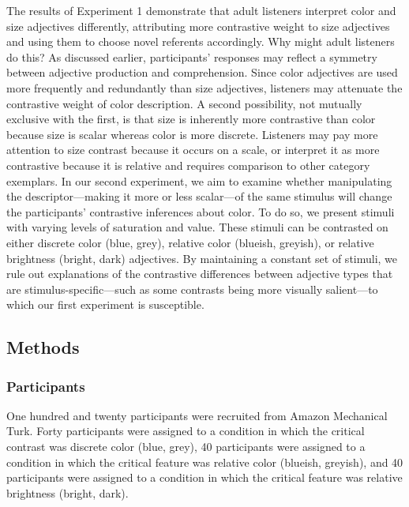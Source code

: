 \documentclass[10pt, letterpaper]{article}
\begin{document}
The results of Experiment 1 demonstrate that adult listeners interpret
color and size adjectives differently, attributing more contrastive
weight to size adjectives and using them to choose novel referents
accordingly. Why might adult listeners do this? As discussed earlier,
participants' responses may reflect a symmetry between adjective
production and comprehension. Since color adjectives are used more
frequently and redundantly than size adjectives, listeners may attenuate
the contrastive weight of color description. A second possibility, not
mutually exclusive with the first, is that size is inherently more
contrastive than color because size is scalar whereas color is more
discrete. Listeners may pay more attention to size contrast because it
occurs on a scale, or interpret it as more contrastive because it is
relative and requires comparison to other category exemplars. In our
second experiment, we aim to examine whether manipulating the
descriptor---making it more or less scalar---of the same stimulus will
change the participants' contrastive inferences about color. To do so,
we present stimuli with varying levels of saturation and value. These
stimuli can be contrasted on either discrete color (blue, grey),
relative color (blueish, greyish), or relative brightness (bright, dark)
adjectives. By maintaining a constant set of stimuli, we rule out
explanations of the contrastive differences between adjective types that
are stimulus-specific---such as some contrasts being more visually
salient---to which our first experiment is susceptible.

\hypertarget{methods}{%
\subsection{Methods}\label{methods}}

\hypertarget{participants}{%
\subsubsection{Participants}\label{participants}}

One hundred and twenty participants were recruited from Amazon
Mechanical Turk. Forty participants were assigned to a condition in
which the critical contrast was discrete color (blue, grey), 40
participants were assigned to a condition in which the critical feature
was relative color (blueish, greyish), and 40 participants were assigned
to a condition in which the critical feature was relative brightness
(bright, dark).
\end{document}
